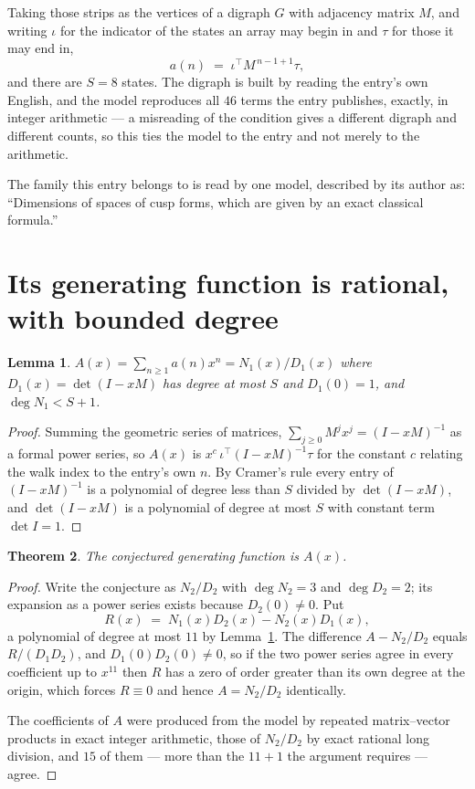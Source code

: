 \documentclass[11pt,a4paper]{article}
\theoremstyle{plain}
\newtheorem{theorem}{Theorem}
\newtheorem{lemma}[theorem]{Lemma}
\theoremstyle{definition}
\begin{document}
Taking those strips as the vertices of a digraph $G$ with adjacency matrix $M$, and writing
$\iota$ for the indicator of the states an array may begin in and $\tau$ for those it may end
in,
\[
a(n)\;=\;\iota^{\!\top}M^{\,n-1+1}\tau ,
\]
and there are $S=8$ states. The digraph is built by reading the entry's own English, and the
model reproduces all $46$ terms the entry publishes, exactly, in integer arithmetic --- a
misreading of the condition gives a different digraph and different counts, so this ties the
model to the entry and not merely to the arithmetic.

The family this entry belongs to is read by one model, described by its author as: ``Dimensions of spaces of cusp forms, which are given by an exact classical formula.''


\section{Its generating function is rational, with bounded degree}

\begin{lemma}\label{lem:rat}
$A(x)=\sum_{n\ge1}a(n)x^n=N_1(x)/D_1(x)$ where $D_1(x)=\det(I-xM)$ has degree at most
$S$ and $D_1(0)=1$, and $\deg N_1<S+1$.
\end{lemma}

\begin{proof}
Summing the geometric series of matrices, $\sum_{j\ge0}M^jx^j=(I-xM)^{-1}$ as a formal
power series, so $A(x)$ is $x^{c}\,\iota^{\!\top}(I-xM)^{-1}\tau$ for the constant $c$
relating the walk index to the entry's own $n$. By Cramer's rule every entry of
$(I-xM)^{-1}$ is a polynomial of degree less than $S$ divided by $\det(I-xM)$, and
$\det(I-xM)$ is a polynomial of degree at most $S$ with constant term $\det I=1$.
\end{proof}

\begin{theorem}
The conjectured generating function is $A(x)$.
\end{theorem}

\begin{proof}
Write the conjecture as $N_2/D_2$ with $\deg N_2=3$ and $\deg D_2=2$; its expansion as a
power series exists because $D_2(0)\neq0$. Put
\[
R(x)\;=\;N_1(x)D_2(x)-N_2(x)D_1(x),
\]
a polynomial of degree at most $11$ by Lemma~\ref{lem:rat}. The difference
$A-N_2/D_2$ equals $R/(D_1D_2)$, and $D_1(0)D_2(0)\neq0$, so if the two power series agree in
every coefficient up to $x^{11}$ then $R$ has a zero of order greater than its own
degree at the origin, which forces $R\equiv0$ and hence $A=N_2/D_2$ identically.

The coefficients of $A$ were produced from the model by repeated matrix--vector products in
exact integer arithmetic, those of $N_2/D_2$ by exact rational long division, and $15$
of them --- more than the $11+1$ the argument requires --- agree.
\end{proof}
\end{document}
